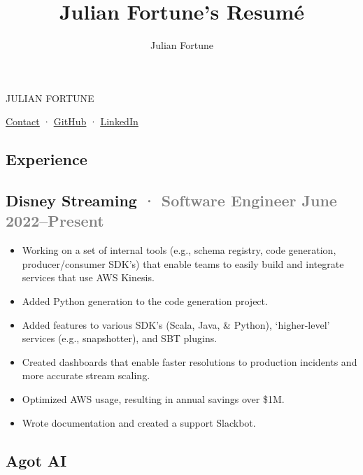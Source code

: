 \documentclass[12pt]{article} %
\title{Julian Fortune's Resumé}
\author{Julian Fortune}
\providecommand{\tightlist}{%
  \setlength{\itemsep}{0pt}\setlength{\parskip}{0pt}}
\let\defaultref\href
\renewcommand{\href}[2]{%
  \defaultref{#1}{\ul{#2}}%
}
\newcommand{\link}[2]{\href{#1}{#2}}
\renewcommand{\emph}[1]{%
  \textcolor{gray}{#1}%
}
\def\separator{ · {}}
\begin{document}
\begin{bfseries}\begin{huge}
  {\selectfont%
    \MakeTextUppercase{Julian Fortune}
  }
\end{huge}\end{bfseries}

  \link{https://julianfortune.com}{Contact}\separator%
    \link{http://github.com/julianfortune}{GitHub}\separator%
\link{http://linkedin.com/in/julianfortune}{LinkedIn}%

%
\begin{paracol}{2}
\begin{raggedright}

\hypertarget{experience}{%
\section{Experience}\label{experience}}

\hypertarget{disney-streaming-software-engineer-june-2022present}{%
\subsection{\texorpdfstring{Disney Streaming \emph{· \small Software
Engineer \hfill June
2022--Present}}{Disney Streaming · Software Engineer June 2022--Present}}\label{disney-streaming-software-engineer-june-2022present}}

\begin{itemize}
\tightlist
\item
  Working on a set of internal tools (e.g., schema registry, code
  generation, producer/consumer SDK's) that enable teams to easily build
  and integrate services that use AWS Kinesis.
\item
  Added Python generation to the code generation project.
\item
  Added features to various SDK's (Scala, Java, \& Python),
  `higher-level' services (e.g., snapshotter), and SBT plugins.
\item
  Created dashboards that enable faster resolutions to production
  incidents and more accurate stream scaling.
\item
  Optimized AWS usage, resulting in annual savings over \$1M.
\item
  Wrote documentation and created a support Slackbot.
\end{itemize}

\hypertarget{agot-ai}{%
\subsection{Agot AI}\label{agot-ai}}


\end{raggedright}
\end{paracol}
\end{document}

